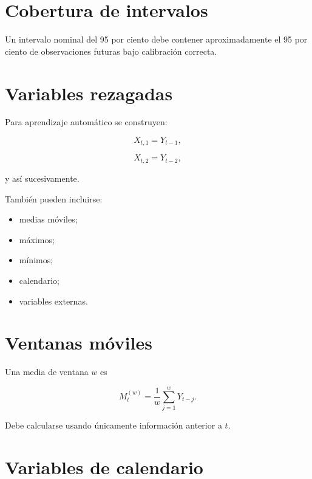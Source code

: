 \documentclass[
  spanish,
  10.5pt,
  letterpaper,
  DIV=11,
  numbers=noendperiod,
  oneside,
  open=any]{scrreprt}
\providecommand{\tightlist}{%
  \setlength{\itemsep}{0pt}\setlength{\parskip}{0pt}}
\theoremstyle{definition}
\theoremstyle{definition}
\theoremstyle{plain}
\theoremstyle{remark}
\begin{document}
\section*{Cobertura de intervalos}\label{cobertura-de-intervalos}


Un intervalo nominal del 95 por ciento debe contener aproximadamente el
95 por ciento de observaciones futuras bajo calibración correcta.

\section*{Variables rezagadas}\label{variables-rezagadas}


Para aprendizaje automático se construyen:

\[
X_{t,1}=Y_{t-1},
\]

\[
X_{t,2}=Y_{t-2},
\]

y así sucesivamente.

También pueden incluirse:

\begin{itemize}
\tightlist
\item
  medias móviles;
\item
  máximos;
\item
  mínimos;
\item
  calendario;
\item
  variables externas.
\end{itemize}

\section*{Ventanas móviles}\label{ventanas-muxf3viles}


Una media de ventana \(w\) es

\[
M_t^{(w)}
=
\frac{1}{w}
\sum_{j=1}^{w}Y_{t-j}.
\]

Debe calcularse usando únicamente información anterior a \(t\).

\section*{Variables de calendario}\label{variables-de-calendario}
\end{document}
